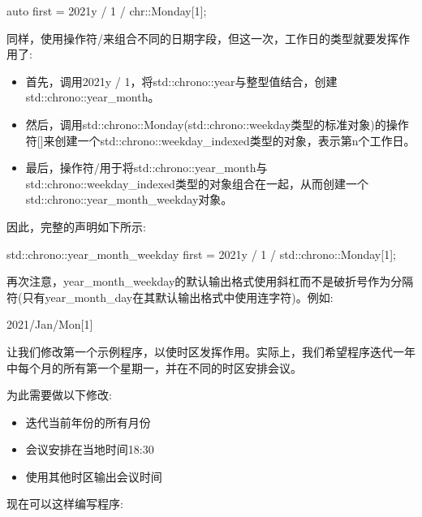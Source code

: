 \begin{shell}
auto first = 2021y / 1 / chr::Monday[1];
\end{shell}

同样，使用操作符/来组合不同的日期字段，但这一次，工作日的类型就要发挥作用了:

\begin{itemize}
\item 
首先，调用2021y / 1，将std::chrono::year与整型值结合，创建std::chrono::year\_month。

\item 
然后，调用std::chrono::Monday(std::chrono::weekday类型的标准对象)的操作符[]来创建一个std::chrono::weekday\_indexed类型的对象，表示第n个工作日。

\item
最后，操作符/用于将std::chrono::year\_month与std::chrono::weekday\_indexed类型的对象组合在一起，从而创建一个std::chrono::year\_month\_weekday对象。
\end{itemize}

因此，完整的声明如下所示:

\begin{cpp}
std::chrono::year_month_weekday first = 2021y / 1 / std::chrono::Monday[1];
\end{cpp}

再次注意，year\_month\_weekday的默认输出格式使用斜杠而不是破折号作为分隔符(只有year\_month\_day在其默认输出格式中使用连字符)。例如:

\begin{shell}
2021/Jan/Mon[1]
\end{shell}


让我们修改第一个示例程序，以使时区发挥作用。实际上，我们希望程序迭代一年中每个月的所有第一个星期一，并在不同的时区安排会议。

为此需要做以下修改:

\begin{itemize}
\item 
迭代当前年份的所有月份

\item 
会议安排在当地时间18:30

\item 
使用其他时区输出会议时间
\end{itemize}

现在可以这样编写程序:



